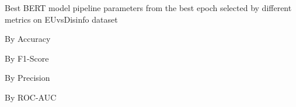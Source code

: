 \begin{table}[!htbp]
    \caption{Best BERT model pipeline parameters from the best epoch selected by different metrics on EUvsDisinfo dataset}
    \label{tab:euvsdisinfo_bert_pipeline_params}
    \centering

    \begin{subtable}[t]{0.48\linewidth}
        \scriptsize
        \caption{By Accuracy}
        
    \end{subtable}
    \hfill
    \begin{subtable}[t]{0.48\linewidth}
        \scriptsize
        \caption{By F1-Score}
        
    \end{subtable}

    \vspace{1em}

    \begin{subtable}[t]{0.48\linewidth}
        \scriptsize
        \caption{By Precision}
        
    \end{subtable}
    \hfill
    \begin{subtable}[t]{0.48\linewidth}
        \scriptsize
        \caption{By ROC-AUC}
        
    \end{subtable}

\end{table}